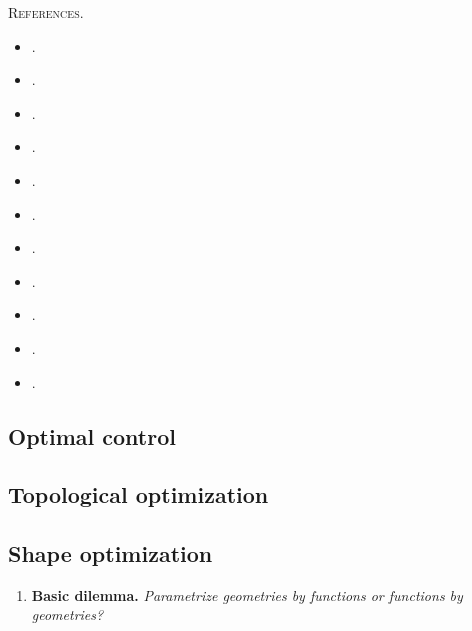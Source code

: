 \documentclass{book}
\numberwithin{equation}{section}
\begin{document}
\begin{enumerate}
\begin{enumerate}
        \textsc{References.}
        \begin{itemize}
            \item \cite{Othmer2008}.
            \item \cite{Othmer_Villiers_Weller2007}.
            \item \cite{Jameson_Martinelli_Pierce1998}.
            \item \cite{Papadimitriou_Giannakoglou2007}.
            \item \cite{Anderson_Venkatakrishnan1999}.
            \item \cite{Turgeon_Pelletier_Borggaard_Etienne2007}.
            \item \cite{Zymaris_Papadimitriou_Giannakoglou_Othmer2009}.
            \item \cite{Zymaris_Papadimitriou_Giannakoglou_Othmer2010}.
            \item \cite{Papoutsis-Kiachagias_Giannakoglou2016}.
            \item \cite{Bueno-Orovio_Castro_Palacios_Zuazua2012}.
            \item \cite{Baeza_Castro_Palacios_Zuazua2009}.
        \end{itemize}
    \end{enumerate}
\end{enumerate}

\subsection{Optimal control}

\subsection{Topological optimization}

\subsection{Shape optimization}
\begin{enumerate}
    \item \textbf{Basic dilemma.} \textit{Parametrize geometries by functions or functions by geometries?}
\end{enumerate}
\end{document}
